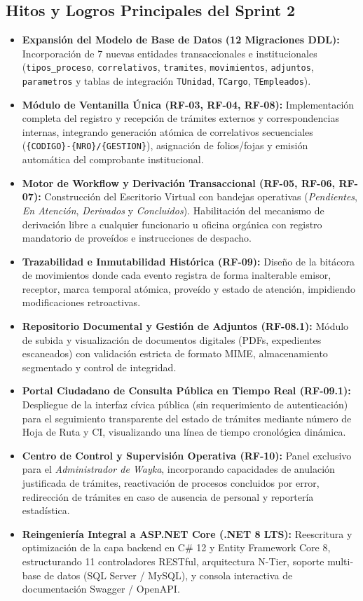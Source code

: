 \documentclass[a4paper,12pt]{article}
\newcommand{\dotnet}{\mbox{.NET}}
\begin{document}
\subsection{Hitos y Logros Principales del Sprint 2}
\begin{itemize}[leftmargin=1.5em]
    \item \textbf{Expansión del Modelo de Base de Datos (12 Migraciones DDL):} Incorporación de 7 nuevas entidades transaccionales e institucionales (\texttt{tipos\_proceso}, \texttt{correlativos}, \texttt{tramites}, \texttt{movimientos}, \texttt{adjuntos}, \texttt{parametros} y tablas de integración \texttt{TUnidad}, \texttt{TCargo}, \texttt{TEmpleados}).
    \item \textbf{Módulo de Ventanilla Única (RF-03, RF-04, RF-08):} Implementación completa del registro y recepción de trámites externos y correspondencias internas, integrando generación atómica de correlativos secuenciales (\texttt{\{CODIGO\}-\{NRO\}/\{GESTION\}}), asignación de folios/fojas y emisión automática del comprobante institucional.
    \item \textbf{Motor de Workflow y Derivación Transaccional (RF-05, RF-06, RF-07):} Construcción del Escritorio Virtual con bandejas operativas (\emph{Pendientes}, \emph{En Atención}, \emph{Derivados} y \emph{Concluidos}). Habilitación del mecanismo de derivación libre a cualquier funcionario u oficina orgánica con registro mandatorio de proveídos e instrucciones de despacho.
    \item \textbf{Trazabilidad e Inmutabilidad Histórica (RF-09):} Diseño de la bitácora de movimientos donde cada evento registra de forma inalterable emisor, receptor, marca temporal atómica, proveído y estado de atención, impidiendo modificaciones retroactivas.
    \item \textbf{Repositorio Documental y Gestión de Adjuntos (RF-08.1):} Módulo de subida y visualización de documentos digitales (PDFs, expedientes escaneados) con validación estricta de formato MIME, almacenamiento segmentado y control de integridad.
    \item \textbf{Portal Ciudadano de Consulta Pública en Tiempo Real (RF-09.1):} Despliegue de la interfaz cívica pública (sin requerimiento de autenticación) para el seguimiento transparente del estado de trámites mediante número de Hoja de Ruta y CI, visualizando una línea de tiempo cronológica dinámica.
    \item \textbf{Centro de Control y Supervisión Operativa (RF-10):} Panel exclusivo para el \emph{Administrador de Wayka}, incorporando capacidades de anulación justificada de trámites, reactivación de procesos concluidos por error, redirección de trámites en caso de ausencia de personal y reportería estadística.
    \item \textbf{Reingeniería Integral a ASP\dotnet{} Core (\dotnet{} 8 LTS):} Reescritura y optimización de la capa backend en C\# 12 y Entity Framework Core 8, estructurando 11 controladores RESTful, arquitectura N-Tier, soporte multi-base de datos (SQL Server / MySQL), y consola interactiva de documentación Swagger / OpenAPI.
\end{itemize}
\end{document}
